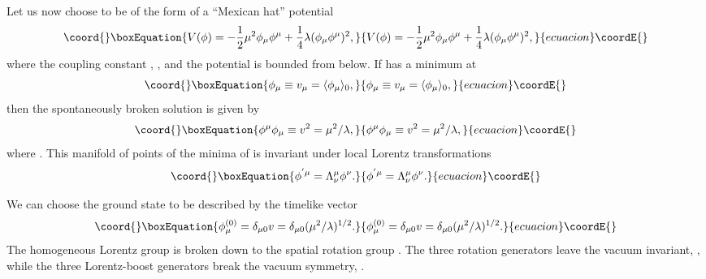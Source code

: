 \documentclass[a4paper,12pt]{article}
\begin{document}
Let us now choose \coordHE{} to be of the form of a ``Mexican hat''
potential
\begin{equation}\coord{}\boxEquation{
\label{phipotential}
V(\phi)=-\frac{1}{2}\mu^2\phi_\mu\phi^\mu+\frac{1}{4}\lambda(\phi_\mu\phi^\mu)^2,
}{
V(\phi)=-\frac{1}{2}\mu^2\phi_\mu\phi^\mu+\frac{1}{4}\lambda(\phi_\mu\phi^\mu)^2,
}{ecuacion}\coordE{}\end{equation}
where the coupling constant \coordHE{}, \coordHE{}, and the
potential is bounded from below. If \coordHE{} has a minimum at
\begin{equation}\coord{}\boxEquation{
\phi_\mu\equiv v_\mu=\langle\phi_\mu\rangle_0,
}{
\phi_\mu\equiv v_\mu=\langle\phi_\mu\rangle_0,
}{ecuacion}\coordE{}\end{equation}
then the spontaneously broken solution is
given by
\begin{equation}\coord{}\boxEquation{
\phi^\mu\phi_\mu\equiv v^2=\mu^2/\lambda,
}{
\phi^\mu\phi_\mu\equiv v^2=\mu^2/\lambda,
}{ecuacion}\coordE{}\end{equation}
where \coordHE{}.  This manifold of points of the minima of \coordHE{} is
invariant under local Lorentz transformations
\begin{equation}\coord{}\boxEquation{
\phi^{'\mu}=\Lambda^\mu_\nu\phi^\nu.
}{
\phi^{'\mu}=\Lambda^\mu_\nu\phi^\nu.
}{ecuacion}\coordE{}\end{equation}

We can choose the ground state to be described by the timelike
vector
\begin{equation}\coord{}\boxEquation{
\label{vev}
\phi_\mu^{(0)}=\delta_{\mu0}v=\delta_{\mu0}(\mu^2/\lambda)^{1/2}.
}{
\phi_\mu^{(0)}=\delta_{\mu0}v=\delta_{\mu0}(\mu^2/\lambda)^{1/2}.
}{ecuacion}\coordE{}\end{equation}
The homogeneous Lorentz group \coordHE{} is broken down to the
spatial rotation group \coordHE{}. The three rotation generators \coordHE{} leave
the vacuum invariant, \coordHE{}, while the three Lorentz-boost generators \coordHE{}
break the vacuum symmetry, \coordHE{}.
\end{document}
